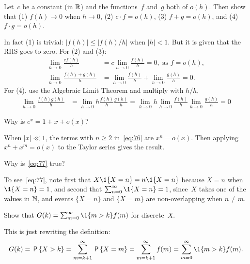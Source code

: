 \documentclass[queueing-book.tex]{subfiles}
\begin{document}
\begin{exercise}\label{ex:l-104}
 Let~$c$ be a constant (in $\mathbb{R}$) and the functions~$f$ and~$g$ both of $o(h)$. Then show that (1) $f(h) \to 0$ when $h\to 0$, (2) $c\cdot f = o(h)$, (3) $f+g=o(h)$, and (4) $f\cdot g=o(h)$.
\begin{solution}
 In fact (1) is trivial: $|f(h)| \leq |f(h)/h|$ when $|h| < 1$.
 But it is given that the RHS goes to zero.
 For (2) and (3):
\begin{align*}
\lim_{h\to 0} \frac{c f(h)}{h} &= c \lim_{h\to 0} \frac{f(h)}{h} = 0, \; \text{as } f = o(h), \\
\lim_{h\to 0} \frac{f(h) + g(h)} h &= \lim_{h\to 0} \frac{f(h)} h + \lim_{h\to 0} \frac{g(h)} h = 0.
\end{align*}
For (4), use the Algebraic Limit Theorem and multiply with $h/h$,
\begin{align*}
\lim_{h\to 0} \frac{f(h)g(h)}{h} &= \lim_{h\to 0} h \frac{f(h)}{h} \frac{g(h)}{h}
= \lim_{h\to 0} h \lim_{h\to 0} \frac{f(h)}{h} \lim_{h\to 0} \frac{g(h)}{h} = 0
\end{align*}
\end{solution}
\end{exercise}


\begin{exercise}\label{ex:87}
 Why is $e^{x} = 1 +x + o(x)$?
\begin{solution}
 When $|x|\ll 1$, the terms with $n\geq 2$ in~\cref{eq:76} are $x^n = o(x)$. Then applying $x^n + x^m = o(x)$ to the Taylor series gives the result.
\end{solution}
\end{exercise}

\begin{exercise}
 Why is~\cref{eq:77} true?
\begin{solution}
To see~\cref{eq:77}, note first that $X\1{X=n} = n\1{X=n}$ because $X=n$ when $\1{X=n} =1$, and second that $\sum_{n=0}^\infty \1{X=n} =1$, since~$X$ takes one of the values in $\mathbb{N}$, and events $\{X=n\}$ and $\{X=m\}$ are non-overlapping when $n\neq m$.
\end{solution}
\end{exercise}

\begin{exercise}\label{ex:l-105}
Show that $G(k) = \sum_{m=0}^\infty \1{m>k} f(m)$ for discrete~$X$.
\begin{solution}
 This is just rewriting the definition:
\begin{equation*}
G(k) = \P{X>k} = \sum_{m=k+1}^\infty \P{X=m} = \sum_{m=k+1}^\infty f(m)=\sum_{m=0}^\infty \1{m>k}f(m).
\end{equation*}
\end{solution}
\end{exercise}
\end{document}
